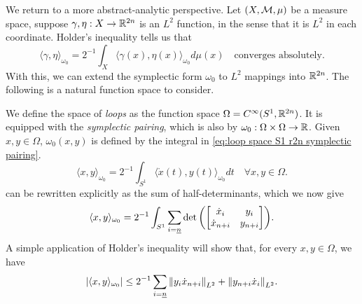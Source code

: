 \documentclass[../main-v2-manifolds.tex]{subfiles}
\begin{document}
%
%
%
%
%
%
We return to a more abstract-analytic perspective. Let $(X,\mathcal{M},\mu)$ be a measure space, suppose $\gamma, \eta: X\to {\mathbb{R}^{2n}}$ is an $L^2$ function, in the sense that it is $L^2$ in each coordinate. Holder's inequality tells us that
\[
    \langle \gamma,\eta\rangle_{\omega_0} = 2^{-1}\int_{X}\langle \gamma(x),\eta (x)\rangle_{\omega_0} d\mu(x)\quad\text{converges absolutely.}
\]
With this, we can extend the symplectic form $\omega_0$ to $L^2$ mappings into ${\mathbb{R}^{2n}}$. The following is a natural function space to consider.
\begin{definition}
    We define the space of \emph{loops} as the function space $\Omega = C^\infty(S^1, {\mathbb{R}^{2n}})$. It is equipped with the \emph{symplectic pairing}, which is also by $\omega_0:\Omega\times\Omega\to\mathbb{R}$. Given $x,y\in\Omega$, $\omega_0(x,y)$ is defined by the integral in \cref{eq:loop space S1 r2n symplectic pairing}.
    \begin{equation}
        \langle x,y\rangle_{\omega_0}= 2^{-1}\int_{S^1} \langle \mathring{x}(t), y(t) \rangle_{\omega_0} dt\quad\forall x,y\in\Omega.
        \label{eq:loop space S1 r2n symplectic pairing}
    \end{equation}
     can be rewritten explicitly as the sum of half-determinants, which we now give
    \begin{equation}
        \langle x,y\rangle_{\omega_0} = 2^{-1}\int_{S^1} \sum_{i=\underline{n}}\det\qty(\mqty[\dot{x}_i & y_i \\ \dot{x}_{n+i} & y_{n+i}]).
        \label{eq:symplectic pairing loops r2n determinant formula}
    \end{equation}
    A simple application of Holder's inequality will show that, for every $x,y\in\Omega$, we have
    \[
        \vert {\langle x,y\rangle_{\omega_0}} \vert\leq 2^{-1}\sum_{i=\underline{n}}\norm{y_i\dot{x}_{n+i}}_{L^2} + \norm{y_{n+i}\dot{x}_{i}}_{L^2}.
    \]    
\end{definition}
\end{document}
